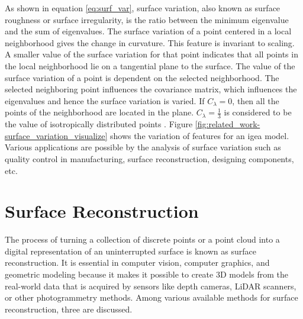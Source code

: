 As shown in equation \ref{eq:surf_var}, surface variation, also known as surface roughness or surface irregularity, is the ratio between the minimum eigenvalue and the sum of eigenvalues. The surface variation of a point centered in a local neighborhood gives the change in curvature. This feature is invariant to scaling. A smaller value of the surface variation for that point indicates that all points in the local neighborhood lie on a tangential plane to the surface. The value of the surface variation of a point is dependent on the selected neighborhood. The selected neighboring point influences the covariance matrix, which influences the eigenvalues and hence the surface variation is varied. If \(C_{\lambda} = 0 \), then all the points of the neighborhood are located in the plane. \(C_{\lambda} = \frac{1}{3} \) is considered to be the value of isotropically distributed points \parencite{pauly2002efficient}. Figure \ref{fig:related_work-surface_variation_visualize} shows the variation of features for an igea model. Various applications are possible by the analysis of surface variation such as quality control in manufacturing, surface reconstruction, designing components, etc.

\section{Surface Reconstruction}
The process of turning a collection of discrete points or a point cloud into a digital representation of an uninterrupted surface is known as surface reconstruction. It is essential in computer vision, computer graphics, and geometric modeling because it makes it possible to create 3D models from the real-world data that is acquired by sensors like depth cameras, LiDAR scanners, or other photogrammetry methods. Among various available methods for surface reconstruction, three are discussed.


